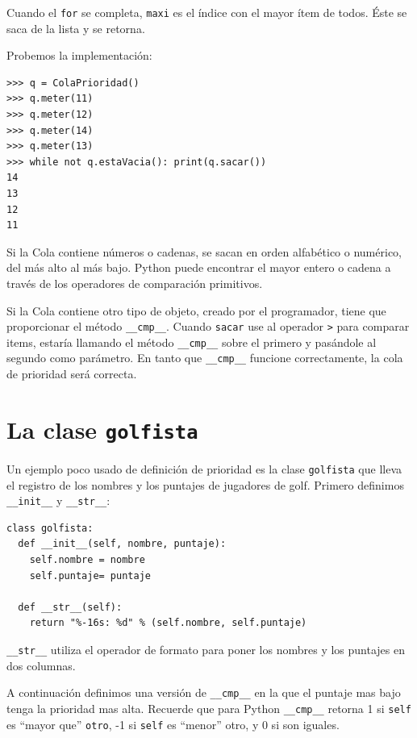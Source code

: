 
Cuando el \texttt{for} se completa, \texttt{maxi} es el índice con
el mayor ítem de todos. Éste se saca de la lista y se retorna.

Probemos la implementación:

\beforeverb 
\begin{verbatim}
>>> q = ColaPrioridad()
>>> q.meter(11)
>>> q.meter(12)
>>> q.meter(14)
>>> q.meter(13)
>>> while not q.estaVacia(): print(q.sacar())
14
13
12
11
\end{verbatim}
\afterverb Si la Cola contiene números o cadenas, se sacan en orden
alfabético o numérico, del más alto al más bajo. Python puede encontrar
el mayor entero o cadena a través de los operadores de comparación
primitivos.

Si la Cola contiene otro tipo de objeto, creado por el programador,
tiene que proporcionar el método \texttt{\_\_cmp\_\_}. Cuando \texttt{sacar}
use al operador \texttt{>} para comparar items, estaría llamando el
método \texttt{\_\_cmp\_\_} sobre el primero y pasándole al segundo
como parámetro. En tanto que \texttt{\_\_cmp\_\_} funcione correctamente,
la cola de prioridad será correcta.

\section{La clase \texttt{golfista}}

   

Un ejemplo poco usado de definición de prioridad es la clase \texttt{golfista}
que lleva el registro de los nombres y los puntajes de jugadores de
golf. Primero definimos \texttt{\_\_init\_\_} y \texttt{\_\_str\_\_}:

\beforeverb 
\begin{verbatim}
class golfista:
  def __init__(self, nombre, puntaje):
    self.nombre = nombre
    self.puntaje= puntaje

  def __str__(self):
    return "%-16s: %d" % (self.nombre, self.puntaje)
\end{verbatim}
\afterverb \texttt{\_\_str\_\_} utiliza el operador de formato para
poner los nombres y los puntajes en dos columnas.

 

A continuación definimos una versión de \texttt{\_\_cmp\_\_} en la
que el puntaje mas bajo tenga la prioridad mas alta. Recuerde que
para Python \texttt{\_\_cmp\_\_} retorna 1 si \texttt{self} es ``mayor
que'' \texttt{otro}, -1 si \texttt{self} es ``menor'' otro, y 0
si son iguales.

